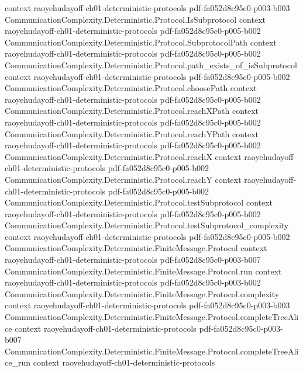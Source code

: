 \begin{theorem}
  {context}
  {raoyehudayoff-ch01-deterministic-protocols}
  {pdf-fa052d8c95c0-p003-b003}
\proofstep
  {CommunicationComplexity.Deterministic.Protocol.IsSubprotocol}
  {context}
  {raoyehudayoff-ch01-deterministic-protocols}
  {pdf-fa052d8c95c0-p005-b002}
\proofstep
  {CommunicationComplexity.Deterministic.Protocol.SubprotocolPath}
  {context}
  {raoyehudayoff-ch01-deterministic-protocols}
  {pdf-fa052d8c95c0-p005-b002}
\proofstep
  {CommunicationComplexity.Deterministic.Protocol.path_exists_of_isSubprotocol}
  {context}
  {raoyehudayoff-ch01-deterministic-protocols}
  {pdf-fa052d8c95c0-p005-b002}
\proofstep
  {CommunicationComplexity.Deterministic.Protocol.choosePath}
  {context}
  {raoyehudayoff-ch01-deterministic-protocols}
  {pdf-fa052d8c95c0-p005-b002}
\proofstep
  {CommunicationComplexity.Deterministic.Protocol.reachXPath}
  {context}
  {raoyehudayoff-ch01-deterministic-protocols}
  {pdf-fa052d8c95c0-p005-b002}
\proofstep
  {CommunicationComplexity.Deterministic.Protocol.reachYPath}
  {context}
  {raoyehudayoff-ch01-deterministic-protocols}
  {pdf-fa052d8c95c0-p005-b002}
\proofstep
  {CommunicationComplexity.Deterministic.Protocol.reachX}
  {context}
  {raoyehudayoff-ch01-deterministic-protocols}
  {pdf-fa052d8c95c0-p005-b002}
\proofstep
  {CommunicationComplexity.Deterministic.Protocol.reachY}
  {context}
  {raoyehudayoff-ch01-deterministic-protocols}
  {pdf-fa052d8c95c0-p005-b002}
\proofstep
  {CommunicationComplexity.Deterministic.Protocol.testSubprotocol}
  {context}
  {raoyehudayoff-ch01-deterministic-protocols}
  {pdf-fa052d8c95c0-p005-b002}
\proofstep
  {CommunicationComplexity.Deterministic.Protocol.testSubprotocol_complexity}
  {context}
  {raoyehudayoff-ch01-deterministic-protocols}
  {pdf-fa052d8c95c0-p005-b002}
\proofstep
  {CommunicationComplexity.Deterministic.FiniteMessage.Protocol}
  {context}
  {raoyehudayoff-ch01-deterministic-protocols}
  {pdf-fa052d8c95c0-p003-b007}
\proofstep
  {CommunicationComplexity.Deterministic.FiniteMessage.Protocol.run}
  {context}
  {raoyehudayoff-ch01-deterministic-protocols}
  {pdf-fa052d8c95c0-p003-b002}
\proofstep
  {CommunicationComplexity.Deterministic.FiniteMessage.Protocol.complexity}
  {context}
  {raoyehudayoff-ch01-deterministic-protocols}
  {pdf-fa052d8c95c0-p003-b003}
\proofstep
  {CommunicationComplexity.Deterministic.FiniteMessage.Protocol.completeTreeAlice}
  {context}
  {raoyehudayoff-ch01-deterministic-protocols}
  {pdf-fa052d8c95c0-p003-b007}
\proofstep
  {CommunicationComplexity.Deterministic.FiniteMessage.Protocol.completeTreeAlice_run}
  {context}
  {raoyehudayoff-ch01-deterministic-protocols}

\end{theorem}
